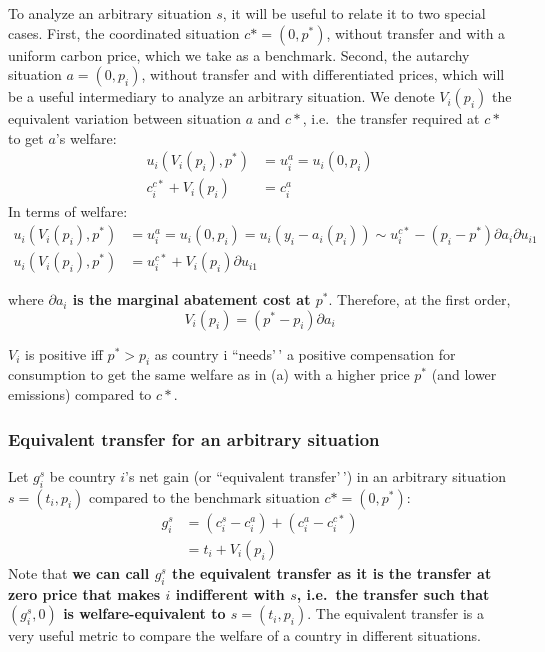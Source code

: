 \documentclass[
  letterpaper,
  DIV=11,
  numbers=noendperiod]{scrartcl}
\begin{document}
To analyze an arbitrary situation \(s\), it will be useful to relate it
to two special cases. First, the coordinated situation \(c*=(0,p^*)\),
without transfer and with a uniform carbon price, which we take as a
benchmark. Second, the autarchy situation \(a=(0, p_i)\), without
transfer and with differentiated prices, which will be a useful
intermediary to analyze an arbitrary situation. We denote \(V_i(p_i)\)
the equivalent variation between situation \(a\) and \(c*\), i.e.~the
transfer required at \(c*\) to get \(a\)'s welfare: \[\begin{aligned}
u_i(V_i(p_i), p^*)&=u^a_i=u_i(0, p_i) \\
c^{c*}_i + V_i(p_i) &= c^a_i
\end{aligned}\] In terms of welfare: \[\begin{aligned}
u_i(V_i(p_i), p^*)&=u^a_i=u_i(0, p_i)=u_i(y_i-a_i(p_i))\sim u^{c*}_i - (p_i - p^*) \partial a_i \partial u_{i1} \\
u_i(V_i(p_i), p^*)&= u^{c*}_i + V_i(p_i)\partial u_{i1}
\end{aligned}\]

where \textbf{\(\partial a_i\) is the marginal abatement cost at
\(p^*\)}. Therefore, at the first order,
\[V_i(p_i) = (p^* - p_i) \partial a_i\]

\(V_i\) is positive iff \(p^* > p_i\) as country i ``needs'\,' a
positive compensation for consumption to get the same welfare as in (a)
with a higher price \(p^*\) (and lower emissions) compared to \(c*\).

\subsubsection{Equivalent transfer for an arbitrary
situation}\label{equivalent-transfer-for-an-arbitrary-situation}

Let \(g^s_i\) be country \(i\)'s net gain (or ``equivalent transfer'\,')
in an arbitrary situation \(s=(t_i, p_i)\) compared to the benchmark
situation \(c*=(0,p^*)\): \[\begin{aligned}
g^s_i &= (c^s_i - c^a_i) + (c^a_i - c^{c*}_i) \\
 &= t_i + V_i(p_i)
\end{aligned}\] Note that \textbf{we can call \(g^s_i\) the equivalent
transfer as it is the transfer at zero price that makes \(i\)
indifferent with \(s\), i.e.~the transfer such that \((g^s_i, 0)\) is
welfare-equivalent to \(s=(t_i, p_i)\)}. The equivalent transfer is a
very useful metric to compare the welfare of a country in different
situations.
\end{document}
